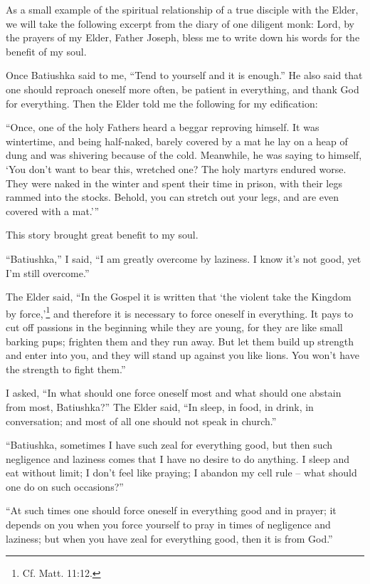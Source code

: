 \begin{longquote}{As a small example of the spiritual relationship of a true disciple with the Elder, we will take the following excerpt from the diary of one diligent monk:}
Lord, by the prayers of my Elder, Father Joseph, bless me to write down his words for the benefit of my soul.

Once Batiushka said to me, ``Tend to yourself and it is enough.'' He also said that one should reproach oneself more often, be patient in everything, and thank God for everything. Then the Elder told me the following for my edification:

``Once, one of the holy Fathers heard a beggar reproving himself. It was wintertime, and being half-naked, barely covered by a mat he lay on a heap of dung and was shivering because of the cold. Meanwhile, he was saying to himself, `You don't want to bear this, wretched one? The holy martyrs endured worse. They were naked in the winter and spent their time in prison, with their legs rammed into the stocks. Behold, you can stretch out your legs, and are even covered with a mat.'''

This story brought great benefit to my soul.

``Batiushka,'' I said, ``I am greatly overcome by laziness. I know it's not good, yet I'm still overcome.''

The Elder said, ``In the Gospel it is written that `the violent take the Kingdom by force,'\footnote{Cf. Matt. 11:12.} and therefore it is necessary to force oneself in everything. It pays to cut off passions in the beginning while they are young, for they are like small barking pups; frighten them and they run away. But let them build up strength and enter into you, and they will stand up against you like lions. You won't have the strength to fight them.''

I asked, ``In what should one force oneself most and what should one abstain from most, Batiushka?'' The Elder said, ``In sleep, in food, in drink, in conversation; and most of all one should not speak in church.''

``Batiushka, sometimes I have such zeal for everything good, but then such negligence and laziness comes that I have no desire to do anything. I sleep and eat without limit; I don't feel like praying; I abandon my cell rule -- what should one do on such occasions?''

``At such times one should force oneself in everything good and in prayer; it depends on you when you force yourself to pray in times of negligence and laziness; but when you have zeal for everything good, then it is from God.''


\end{longquote}
